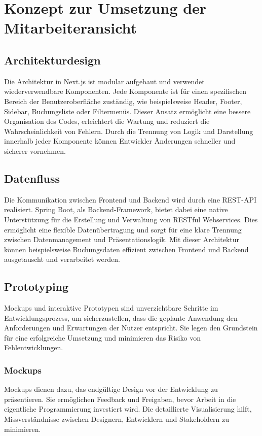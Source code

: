 \section{Konzept zur Umsetzung der Mitarbeiteransicht}

\subsection{Architekturdesign}
Die Architektur in Next.js ist modular aufgebaut und verwendet wiederverwendbare Komponenten. Jede Komponente ist für einen spezifischen Bereich der Benutzeroberfläche zuständig, wie beispielsweise Header, Footer, Sidebar, Buchungsliste oder Filtermenüs. Dieser Ansatz ermöglicht eine bessere Organisation des Codes, erleichtert die Wartung und reduziert die Wahrscheinlichkeit von Fehlern. Durch die Trennung von Logik und Darstellung innerhalb jeder Komponente können Entwickler Änderungen schneller und sicherer vornehmen.\textit{\cite{rathinam2022analysis}}

\subsection{Datenfluss}
Die Kommunikation zwischen Frontend und Backend wird durch eine REST-API realisiert. Spring Boot, als Backend-Framework, bietet dabei eine native Unterstützung für die Erstellung und Verwaltung von RESTful Webservices. Dies ermöglicht eine flexible Datenübertragung und sorgt für eine klare Trennung zwischen Datenmanagement und Präsentationslogik. Mit dieser Architektur können beispielsweise Buchungsdaten effizient zwischen Frontend und Backend ausgetauscht und verarbeitet werden. \textit{\cite{shetty2020review, rathinam2022analysis}}

\subsection{Prototyping}

Mockups und interaktive Prototypen sind unverzichtbare Schritte im Entwicklungsprozess, um sicherzustellen, dass die geplante Anwendung den Anforderungen und Erwartungen der Nutzer entspricht. Sie legen den Grundstein für eine erfolgreiche Umsetzung und minimieren das Risiko von Fehlentwicklungen.


\subsubsection{Mockups}
Mockups dienen dazu, das endgültige Design vor der Entwicklung zu präsentieren. Sie ermöglichen Feedback und Freigaben, bevor Arbeit in die eigentliche Programmierung investiert wird. Die detaillierte Visualisierung hilft, Missverständnisse zwischen Designern, Entwicklern und Stakeholdern zu minimieren.

